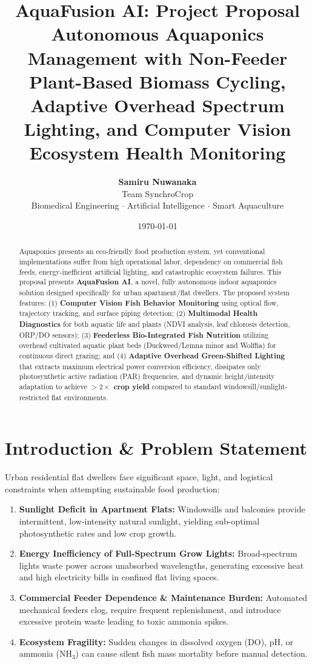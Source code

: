 \documentclass[12pt,a4paper]{article}
\title{\textbf{AquaFusion AI: Project Proposal}\\
\large Autonomous Aquaponics Management with Non-Feeder Plant-Based Biomass Cycling, Adaptive Overhead Spectrum Lighting, and Computer Vision Ecosystem Health Monitoring}
\author{\textbf{Samiru Nuwanaka} \\ Team SynchroCrop \\ Biomedical Engineering $\cdot$ Artificial Intelligence $\cdot$ Smart Aquaculture}
\date{\today}
\begin{document}
\maketitle

\begin{abstract}
Aquaponics presents an eco-friendly food production system, yet conventional implementations suffer from high operational labor, dependency on commercial fish feeds, energy-inefficient artificial lighting, and catastrophic ecosystem failures. This proposal presents \textbf{AquaFusion AI}, a novel, fully autonomous indoor aquaponics solution designed specifically for urban apartment/flat dwellers. The proposed system features: (1) \textbf{Computer Vision Fish Behavior Monitoring} using optical flow, trajectory tracking, and surface piping detection; (2) \textbf{Multimodal Health Diagnostics} for both aquatic life and plants (NDVI analysis, leaf chlorosis detection, ORP/DO sensors); (3) \textbf{Feederless Bio-Integrated Fish Nutrition} utilizing overhead cultivated aquatic plant beds (Duckweed/Lemna minor and Wolffia) for continuous direct grazing; and (4) \textbf{Adaptive Overhead Green-Shifted Lighting} that extracts maximum electrical power conversion efficiency, dissipates only photosynthetic active radiation (PAR) frequencies, and dynamic height/intensity adaptation to achieve \textbf{$>2\times$ crop yield} compared to standard windowsill/sunlight-restricted flat environments.
\end{abstract}

\tableofcontents
\newpage

\section{Introduction \& Problem Statement}
Urban residential flat dwellers face significant space, light, and logistical constraints when attempting sustainable food production:
\begin{enumerate}
    \item \textbf{Sunlight Deficit in Apartment Flats:} Windowsills and balconies provide intermittent, low-intensity natural sunlight, yielding sub-optimal photosynthetic rates and low crop growth.
    \item \textbf{Energy Inefficiency of Full-Spectrum Grow Lights:} Broad-spectrum lights waste power across unabsorbed wavelengths, generating excessive heat and high electricity bills in confined flat living spaces.
    \item \textbf{Commercial Feeder Dependence \& Maintenance Burden:} Automated mechanical feeders clog, require frequent replenishment, and introduce excessive protein waste leading to toxic ammonia spikes.
    \item \textbf{Ecosystem Fragility:} Sudden changes in dissolved oxygen ($\text{DO}$), pH, or ammonia ($\text{NH}_3$) can cause silent fish mass mortality before manual detection.
\end{enumerate}
\end{document}
